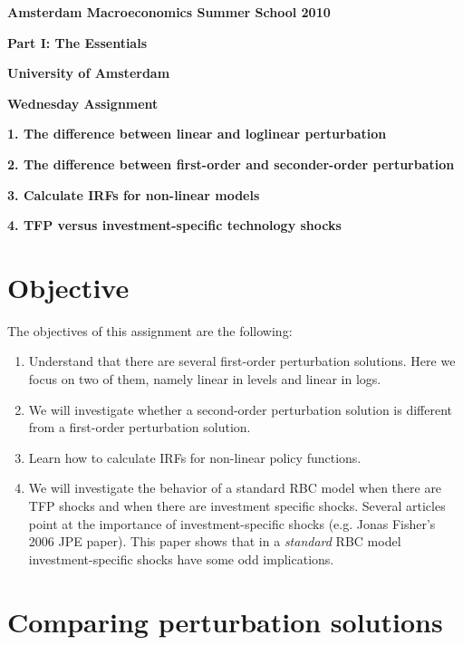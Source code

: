 \documentclass{article}
\begin{document}
\begin{center}
\textbf{Amsterdam Macroeconomics Summer School 2010}

\textbf{Part I: The Essentials}

\textbf{University of Amsterdam\bigskip }

\textbf{Wednesday Assignment}

\textbf{1. The difference between linear and loglinear perturbation}

\textbf{2. The difference between first-order and seconder-order perturbation%
}

\textbf{3. Calculate IRFs for non-linear models}

\textbf{4. TFP versus investment-specific technology shocks}{\huge \\[0pt]
}
\end{center}

\section{Objective}

The objectives of this assignment are the following:

\begin{enumerate}
\item Understand that there are several first-order perturbation solutions.
Here we focus on two of them, namely linear in levels and linear in logs.

\item We will investigate whether a second-order perturbation solution is
different from a first-order perturbation solution.

\item Learn how to calculate IRFs for non-linear policy functions.

\item We will investigate the behavior of a standard RBC model when there
are TFP shocks and when there are investment specific shocks. Several
articles point at the importance of investment-specific shocks (e.g. Jonas
Fisher's 2006 JPE paper). This paper shows that in a \emph{standard} RBC
model investment-specific shocks have some odd implications.
\end{enumerate}

\section{Comparing perturbation solutions}
\end{document}
